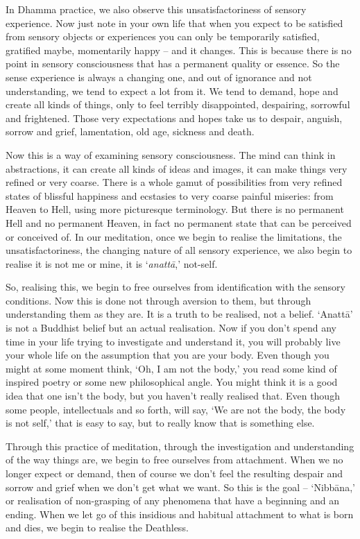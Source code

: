 In Dhamma practice, we also observe this unsatisfactoriness of sensory experience. Now just note in your own life that when you expect to be satisfied from sensory objects or experiences you can only be temporarily satisfied, gratified maybe, momentarily happy -- and it changes. This is because there is no point in sensory consciousness that has a permanent quality or essence. So the sense experience is always a changing one, and out of ignorance and not understanding, we tend to expect a lot from it. We tend to demand, hope and create all kinds of things, only to feel terribly disappointed, despairing, sorrowful and frightened. Those very expectations and hopes take us to despair, anguish, sorrow and grief, lamentation, old age, sickness and death.

Now this is a way of examining sensory consciousness. The mind can think in abstractions, it can create all kinds of ideas and images, it can make things very refined or very coarse. There is a whole gamut of possibilities from very refined states of blissful happiness and ecstasies to very coarse painful miseries: from Heaven to Hell, using more picturesque terminology. But there is no permanent Hell and no permanent Heaven, in fact no permanent state that can be perceived or conceived of. In our meditation, once we begin to realise the limitations, the unsatisfactoriness, the changing nature of all sensory experience, we also begin to realise it is not me or mine, it is `\textit{anattā},' not-self.

So, realising this, we begin to free ourselves from identification with the sensory conditions. Now this is done not through aversion to them, but through understanding them as they are. It is a truth to be realised, not a belief. `Anattā' is not a Buddhist belief but an actual realisation. Now if you don't spend any time in your life trying to investigate and understand it, you will probably live your whole life on the assumption that you are your body. Even though you might at some moment think, `Oh, I am not the body,' you read some kind of inspired poetry or some new philosophical angle. You might think it is a good idea that one isn't the body, but you haven't really realised that. Even though some people, intellectuals and so forth, will say, `We are not the body, the body is not self,' that is easy to say, but to really know that is something else.

Through this practice of meditation, through the investigation and understanding of the way things are, we begin to free ourselves from attachment. When we no longer expect or demand, then of course we don't feel the resulting despair and sorrow and grief when we don't get what we want. So this is the goal -- `Nibbāna,' or realisation of non-grasping of any phenomena that have a beginning and an ending. When we let go of this insidious and habitual attachment to what is born and dies, we begin to realise the Deathless.

